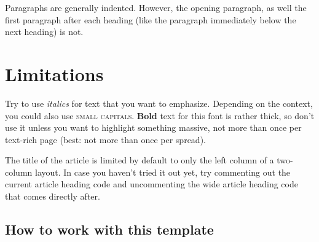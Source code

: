 \documentclass{visionen}
\begin{document}






Paragraphs are generally indented. However, the opening paragraph, as well the first paragraph after each heading (like the paragraph immediately below the next heading) is not.

\section{Limitations}

Try to use \emph{italics} for text that you want to emphasize. Depending on the context, you could also use \textsc{small capitals}. \textbf{Bold} text for this font is rather thick, so don't use it unless you want to highlight something massive, not more than once per text-rich page (best: not more than once per spread).

The title of the article is limited by default to only the left column of a two-column layout. In case you haven't tried it out yet, try commenting out the current article heading code and uncommenting the wide article heading code that comes directly after. 

\subsection{How to work with this template}
\end{document}
